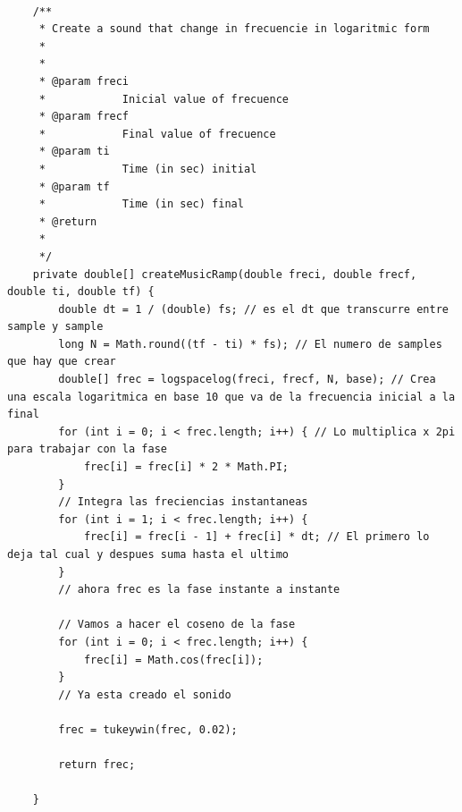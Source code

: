 \documentclass{article}
\begin{document}
    \begin{minipage}{\textwidth}
    \begin{lstlisting}[caption=Código que genera una rampa de frecuencia que varia en forma continua. Cada una de estas rampas es la representación sonora de un segmento en la lógica del vOICe pero preservando la continuidad de la señal al cambiar en forma continua la frecuencia como se observa en la figura \ref{fig:rampaFrec}., label=code:rampa]
    
    /**
	 * Create a sound that change in frecuencie in logaritmic form
	 * 
	 * 
	 * @param freci
	 *            Inicial value of frecuence
	 * @param frecf
	 *            Final value of frecuence
	 * @param ti
	 *            Time (in sec) initial
	 * @param tf
	 *            Time (in sec) final
	 * @return
	 * 
	 */
	private double[] createMusicRamp(double freci, double frecf, double ti, double tf) {
		double dt = 1 / (double) fs; // es el dt que transcurre entre sample y sample
		long N = Math.round((tf - ti) * fs); // El numero de samples que hay que crear
		double[] frec = logspacelog(freci, frecf, N, base); // Crea una escala logaritmica en base 10 que va de la frecuencia inicial a la final
		for (int i = 0; i < frec.length; i++) { // Lo multiplica x 2pi para trabajar con la fase
			frec[i] = frec[i] * 2 * Math.PI;
		}
		// Integra las freciencias instantaneas
		for (int i = 1; i < frec.length; i++) {
			frec[i] = frec[i - 1] + frec[i] * dt; // El primero lo deja tal cual y despues suma hasta el ultimo
		}
		// ahora frec es la fase instante a instante

		// Vamos a hacer el coseno de la fase
		for (int i = 0; i < frec.length; i++) {
			frec[i] = Math.cos(frec[i]);
		}
		// Ya esta creado el sonido

		frec = tukeywin(frec, 0.02);

		return frec;

	}
	\end{lstlisting}
    \end{minipage}

	
\end{document}
